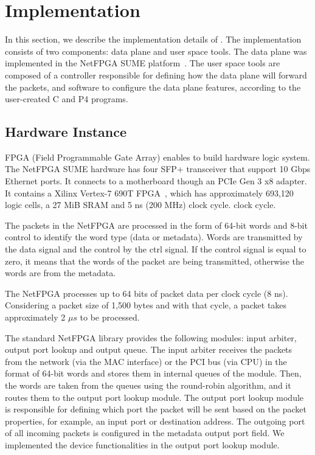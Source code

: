 \section{Implementation}
\label{sec:implementation}

In this section, we describe the implementation details of \system.
The implementation consists of two components: data plane and user space tools. 
The data plane was implemented in the NetFPGA SUME platform~\cite{SUME2014}.
The user space tools are composed of a controller responsible for defining how the data plane will forward the packets, and software to configure the data plane features, according to the user-created C and P4 programs.


\subsection{Hardware Instance}

FPGA (Field Programmable Gate Array) enables to build hardware logic system.
The NetFPGA SUME hardware has four SFP+ transceiver that support 10 Gbps Ethernet ports.
It connects to a motherboard though an PCIe Gen 3 x8 adapter.
It contains a Xilinx Vertex-7 690T FPGA~\cite{Virtex7},
which has approximately 693,120 logic cells, a 27 MiB SRAM and 5 ns (200 MHz) clock cycle.  
 clock cycle.

The packets in the NetFPGA are processed in the form of 64-bit words and 8-bit control to identify the word type (data or metadata). Words are transmitted by the data signal and the control by the ctrl signal. If the control signal is equal to zero, it means that the words of the packet are being transmitted, otherwise the words are from the metadata.

The NetFPGA processes up to 64 bits of packet data per clock cycle (8 ns). Considering a packet size of 1,500 bytes and with that cycle, a packet takes approximately 2 $\mu{s}$ to be processed.

The standard NetFPGA library provides the following modules: input arbiter, output port lookup and output queue. 
The input arbiter receives the packets from the network (via the MAC interface) or the PCI bus (via CPU) in the format of 64-bit words and stores them in internal queues of the module.
Then, the words are taken from the queues using the round-robin algorithm, and it routes them to
the output port lookup module. 
The output port lookup module is responsible for defining which port the packet will be sent based
on the packet properties, for example, an input port or destination address. 
The outgoing port of all incoming packets is configured in the metadata output port field.
We implemented the device functionalities in the output port lookup module.


